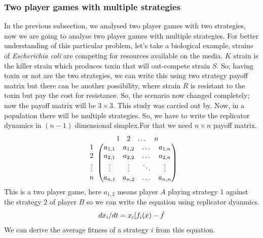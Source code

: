 \documentclass{article}
\begin{document}
\subsubsection{Two player games with multiple strategies}
In the previous subsection, we analysed two player games with two strategies, now we are going to analyse two player games with multiple strategies. For better understanding of this particular problem, let's take a biological example, strains of \textit{Escherichia coli} are competing for resources available on the media. $K$ strain is the killer strain which produces toxin that will out-compete strain $S$. So, having toxin or not are the two strategies, we can write this using two strategy payoff matrix but there can be another possibility, where strain $R$ is resistant to the toxin but pay the cost for resistance. So, the scenario now changed completely; now the payoff matrix will be $3 \times 3$. This study was carried out by\citep{Kerr2002}\citep{Czaran2002}.
Now, in a population there will be multiple strategies. So, we have to write the replicator dynamics in $(n-1)$ dimensional simplex.For that we need $n\times n$ payoff matrix.
\[
\begin{array}{c@{}c}
   & \begin{array}{cccc} 1 & 2 & \dots & n \end{array} \\ 
   \begin{array}{c} 
       1 \\ 
       2 \\ 
       \vdots \\ 
       n 
   \end{array} 
   & 
   \begin{pmatrix}
       a_{1,1} & a_{1,2} & \dots & a_{1,n} \\
       a_{2,1} & a_{2,2} & \dots & a_{2,n} \\
       \vdots & \vdots & \ddots & \vdots \\
       a_{n,1} & a_{n,2} & \dots & a_{n,n}
   \end{pmatrix}
\end{array}
\] \label{eq:6}
This is a two player game, here $a_{1,2}$ means player $A$ playing strategy $1$ against the strategy $2$ of player $B$ so we can write the equation using replicator dyanmics.
\begin{equation}
dx_i/dt=x_i[f_i(x)-\bar{f}\nonumber\\
\end{equation}
We can derive the average fitness of a strategy $i$ from this equation.
\end{document}
